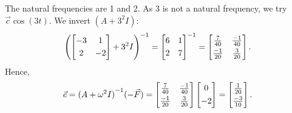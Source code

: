 \documentclass{ximera}
\begin{document}
\begin{exampleSol}
    The natural frequencies are 1 and 2.  As 3 is not a natural frequency, we try $\vec{c} \cos (3t)$. We invert $(A+3^2 I)$:
    \begin{equation*}
        {\left( 
        \begin{bmatrix}
            -3 & 1 \\
            \noalign{\smallskip}
            2 & -2
        \end{bmatrix}
        +3^2 I\right)}^{-1} =
        {\begin{bmatrix}
            6 & 1 \\
            \noalign{\smallskip}
            2 & 7
        \end{bmatrix}}^{-1} =
        \begin{bmatrix}
            \frac{7}{40} & \frac{-1}{40} \\
            \noalign{\smallskip}
            \frac{-1}{20} & \frac{3}{20}
        \end{bmatrix} .
    \end{equation*}
    Hence,
    \begin{equation*}
        \vec{c} = {(A +\omega^2 I)}^{-1} (-\vec{F} ) = 
        \begin{bmatrix}
            \frac{7}{40} & \frac{-1}{40} \\
            \noalign{\smallskip}
            \frac{-1}{20} & \frac{3}{20}
        \end{bmatrix}
        \begin{bmatrix}
            0 \\
            \noalign{\smallskip}
            -2
        \end{bmatrix}
        =
        \begin{bmatrix}
            \frac{1}{20} \\
            \noalign{\smallskip}
            \frac{-3}{10}
        \end{bmatrix} .
    \end{equation*}
    

\end{exampleSol}
\end{document}
